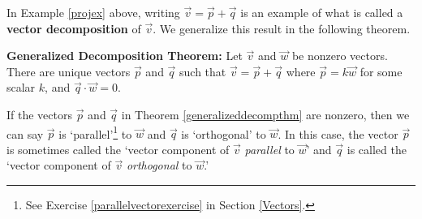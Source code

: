\documentclass{ximera}
\begin{document}
\begin{example}
\begin{explanation}
\begin{center}
\end{center}
\end{explanation}
\end{example}
 

In Example \ref{projex} above, writing $\overrightarrow{v} = \overrightarrow{p} + \overrightarrow{q}$ is an example of what is called a \textbf{vector decomposition} of $\overrightarrow{v}$.  We generalize this result in the following theorem.
 
 


\begin{theorem} \label{generalizeddecompthm}  \textbf{Generalized Decomposition Theorem:}  Let $\overrightarrow{v}$ and $\overrightarrow{w}$ be nonzero vectors.  There are unique vectors $\overrightarrow{p}$ and $\overrightarrow{q}$  such that $\overrightarrow{v} = \overrightarrow{p} + \overrightarrow{q}$ where $\overrightarrow{p} = k \overrightarrow{w}$ for some scalar $k$, and $\overrightarrow{q} \cdot \overrightarrow{w} = 0$.

\end{theorem}



 

If the vectors $\overrightarrow{p}$ and $\overrightarrow{q}$ in Theorem \ref{generalizeddecompthm} are  nonzero, then we can say $\overrightarrow{p}$ is `parallel'\footnote{See Exercise \ref{parallelvectorexercise} in Section \ref{Vectors}.} to $\overrightarrow{w}$ and $\overrightarrow{q}$ is  `orthogonal' to $\overrightarrow{w}$. In this case, the vector $\overrightarrow{p}$ is sometimes called the `vector component of $\overrightarrow{v}$ \textit{parallel} to $\overrightarrow{w}$' and $\overrightarrow{q}$ is called the `vector component of $\overrightarrow{v}$ \textit{orthogonal} to $\overrightarrow{w}$.' 
\end{document}
